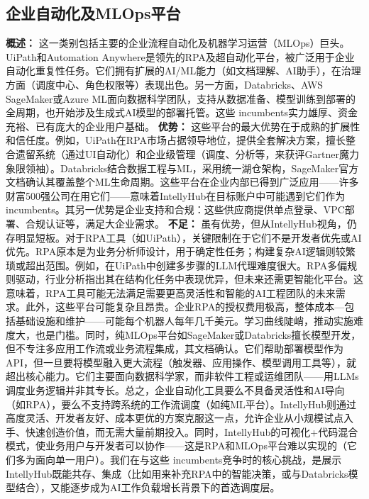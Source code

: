 \documentclass[11点, A4纸, 单面]{article}
\begin{document}
\subsection{企业自动化及MLOps平台}
\textbf{概述：} 这一类别包括主要的企业流程自动化及机器学习运营（MLOps）巨头。UiPath和Automation Anywhere是领先的RPA及超自动化平台，被广泛用于企业自动化重复性任务。它们拥有扩展的AI/ML能力（如文档理解、AI助手），在治理方面（调度中心、角色权限等）表现出色。另一方面，Databricks、AWS SageMaker或Azure ML面向数据科学团队，支持从数据准备、模型训练到部署的全周期，也开始涉及生成式AI模型的部署托管。这些 incumbents实力雄厚、资金充裕、已有庞大的企业用户基础。
\newline\newline
\textbf{优势：} 这些平台的最大优势在于成熟的扩展性和信任度。例如，UiPath在RPA市场占据领导地位，提供全套解决方案，擅长整合遗留系统（通过UI自动化）和企业级管理（调度、分析等，来获评Gartner魔力象限领袖\cite{uipathGartner}）。Databricks结合数据工程与ML，采用统一湖仓架构，SageMaker官方文档确认其覆盖整个ML生命周期\cite{awsSagemaker}。这些平台在企业内部已得到广泛应用——许多财富500强公司在用它们——意味着IntellyHub在目标账户中可能遇到它们作为 incumbents。其另一优势是企业支持和合规：这些供应商提供单点登录、VPC部署、合规认证等，满足大企业需求。
\newline\newline
\textbf{不足：} 虽有优势，但从IntellyHub视角，仍存明显短板。对于RPA工具（如UiPath），关键限制在于它们不是开发者优先或AI优先。RPA原本是为业务分析师设计，用于确定性任务；构建复杂AI逻辑则较繁琐或超出范围。例如，在UiPath中创建多步骤的LLM代理难度很大。RPA多偏规则驱动，行业分析指出其在结构化任务中表现优异，但未来还需更智能化平台\cite{forresterRPAvsAI}。这意味着，RPA工具可能无法满足需要更高灵活性和智能的AI工程团队的未来需求。此外，这些平台可能复杂且昂贵。企业RPA的授权费用极高，整体成本—包括基础设施和维护——可能每个机器人每年几千美元。学习曲线陡峭，推动实施难度大，也是门槛。同时，纯MLOps平台如SageMaker或Databricks擅长模型开发，但不专注多应用工作流或业务流程集成，其文档确认\cite{awsSagemaker}。它们帮助部署模型作为API，但一旦要将模型融入更大流程（触发器、应用操作、模型调用工具等），就超出核心能力。它们主要面向数据科学家，而非软件工程或运维团队——用LLMs调度业务逻辑并非其专长。总之，企业自动化工具要么不具备灵活性和AI导向（如RPA），要么不支持跨系统的工作流调度（如纯ML平台）。IntellyHub则通过高度灵活、开发者友好、成本更优的方案克服这一点，允许企业从小规模试点入手、快速创造价值，而无需大量前期投入。同时，IntellyHub的可视化+代码混合模式，使业务用户与开发者可以协作——这是RPA和MLOps平台难以实现的（它们多为面向单一用户）。我们在与这些 incumbents竞争时的核心挑战，是展示IntellyHub既能共存、集成（比如用来补充RPA中的智能决策，或与Databricks模型结合），又能逐步成为AI工作负载增长背景下的首选调度层。
\end{document}
